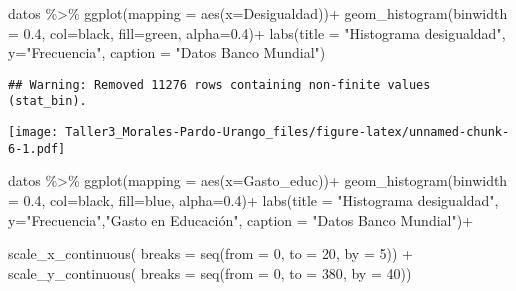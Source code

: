 \documentclass[
]{article}
\newenvironment{Shaded}{\begin{snugshade}}{\end{snugshade}}
\newcommand{\AttributeTok}[1]{\textcolor[rgb]{0.77,0.63,0.00}{#1}}
\newcommand{\DecValTok}[1]{\textcolor[rgb]{0.00,0.00,0.81}{#1}}
\newcommand{\FloatTok}[1]{\textcolor[rgb]{0.00,0.00,0.81}{#1}}
\newcommand{\FunctionTok}[1]{\textcolor[rgb]{0.00,0.00,0.00}{#1}}
\newcommand{\NormalTok}[1]{#1}
\newcommand{\SpecialCharTok}[1]{\textcolor[rgb]{0.00,0.00,0.00}{#1}}
\newcommand{\StringTok}[1]{\textcolor[rgb]{0.31,0.60,0.02}{#1}}
\begin{document}
\begin{Shaded}
\begin{Highlighting}[]
\NormalTok{datos }\SpecialCharTok{\%\textgreater{}\%} \FunctionTok{ggplot}\NormalTok{(}\AttributeTok{mapping =} \FunctionTok{aes}\NormalTok{(}\AttributeTok{x=}\NormalTok{Desigualdad))}\SpecialCharTok{+}
  \FunctionTok{geom\_histogram}\NormalTok{(}\AttributeTok{binwidth =} \FloatTok{0.4}\NormalTok{, }\AttributeTok{col=}\StringTok{\textquotesingle{}black\textquotesingle{}}\NormalTok{, }\AttributeTok{fill=}\StringTok{\textquotesingle{}green\textquotesingle{}}\NormalTok{, }\AttributeTok{alpha=}\FloatTok{0.4}\NormalTok{)}\SpecialCharTok{+}
  \FunctionTok{labs}\NormalTok{(}\AttributeTok{title =} \StringTok{"Histograma desigualdad"}\NormalTok{, }\AttributeTok{y=}\StringTok{"Frecuencia"}\NormalTok{, }\AttributeTok{caption =} \StringTok{"Datos Banco Mundial"}\NormalTok{)}
\end{Highlighting}
\end{Shaded}

\begin{verbatim}
## Warning: Removed 11276 rows containing non-finite values (stat_bin).
\end{verbatim}

\texttt{[image: Taller3\_Morales-Pardo-Urango\_files/figure-latex/unnamed-chunk-6-1.pdf]}

\begin{Shaded}
\begin{Highlighting}[]
\NormalTok{datos }\SpecialCharTok{\%\textgreater{}\%} \FunctionTok{ggplot}\NormalTok{(}\AttributeTok{mapping =} \FunctionTok{aes}\NormalTok{(}\AttributeTok{x=}\NormalTok{Gasto\_educ))}\SpecialCharTok{+}
  \FunctionTok{geom\_histogram}\NormalTok{(}\AttributeTok{binwidth =} \FloatTok{0.4}\NormalTok{, }\AttributeTok{col=}\StringTok{\textquotesingle{}black\textquotesingle{}}\NormalTok{, }\AttributeTok{fill=}\StringTok{\textquotesingle{}blue\textquotesingle{}}\NormalTok{, }\AttributeTok{alpha=}\FloatTok{0.4}\NormalTok{)}\SpecialCharTok{+}
  \FunctionTok{labs}\NormalTok{(}\AttributeTok{title =} \StringTok{"Histograma desigualdad"}\NormalTok{, }\AttributeTok{y=}\StringTok{"Frecuencia"}\NormalTok{,}\StringTok{"Gasto en Educación"}\NormalTok{, }\AttributeTok{caption =} \StringTok{"Datos Banco Mundial"}\NormalTok{)}\SpecialCharTok{+}
  
 \FunctionTok{scale\_x\_continuous}\NormalTok{(}
    \AttributeTok{breaks =} \FunctionTok{seq}\NormalTok{(}\AttributeTok{from =} \DecValTok{0}\NormalTok{, }\AttributeTok{to =} \DecValTok{20}\NormalTok{, }\AttributeTok{by =} \DecValTok{5}\NormalTok{)) }\SpecialCharTok{+}
  \FunctionTok{scale\_y\_continuous}\NormalTok{(}
    \AttributeTok{breaks =} \FunctionTok{seq}\NormalTok{(}\AttributeTok{from =} \DecValTok{0}\NormalTok{, }\AttributeTok{to =} \DecValTok{380}\NormalTok{, }\AttributeTok{by =} \DecValTok{40}\NormalTok{))}
\end{Highlighting}
\end{Shaded}
\end{document}
